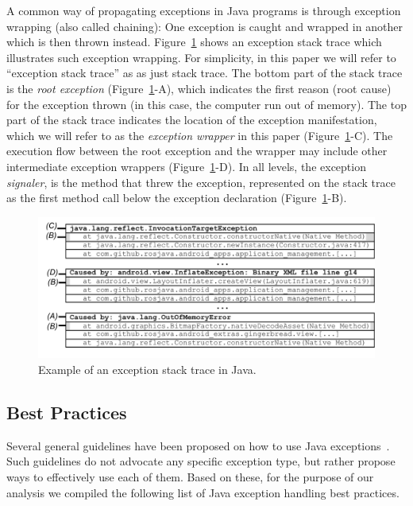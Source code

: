  A common way of  propagating exceptions in Java programs is through
 exception wrapping (also called chaining):
One exception 
is caught and wrapped in another which is then thrown instead. Figure~\ref{fig:wrapping} shows 
an exception stack trace which illustrates such exception wrapping. 
For simplicity, in this paper we will refer to ``exception stack trace'' as as just stack trace.
The bottom part of the stack trace is the \emph{root exception} (Figure~\ref{fig:wrapping}-A), which indicates
the first reason (root cause) for the exception thrown (in this case, the computer run out of
memory). The top part of the stack trace indicates the location of the exception
manifestation, which we will refer to as the \emph{exception wrapper} in this paper (Figure~\ref{fig:wrapping}-C). The
execution flow  between the root exception and the wrapper may
include other intermediate exception wrappers (Figure~\ref{fig:wrapping}-D). In all levels, the exception
\emph{signaler}, is the method that threw the exception, represented on the
stack trace as the first method call below the exception declaration (Figure~\ref{fig:wrapping}-B).

\begin{figure} \centering \includegraphics[scale=0.55]{stack_review6.png}
\caption{Example of an exception stack trace in Java.}
\label{fig:wrapping}
\end{figure}

\subsection{Best Practices}
\label{sec:best}

Several general guidelines have been proposed on how to use Java
exceptions~\cite{mandrioli1992advances,gosling2000java,wirfs2006toward,
bloch2008effective}. Such guidelines do not
advocate any specific exception type, but rather propose ways to effectively use each of them.
Based on these, for the purpose of our analysis we compiled the following list of Java exception handling best practices.

